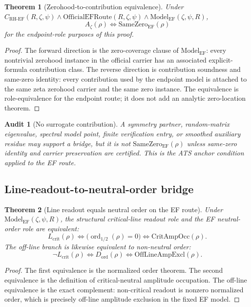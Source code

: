\documentclass[11pt]{article}
\newtheorem{theorem}{Theorem}[section]
\newtheorem{audit}{Audit}[section]
\newcommand{\Az}{A_{\zeta}}
\newcommand{\Lcrit}{L_{\mathrm{crit}}}
\newcommand{\CRHEF}{C_{\mathrm{RH}\text{-}\mathrm{EF}}}
\newcommand{\ModelEF}{\mathrm{Model}_{\mathrm{EF}}}
\newcommand{\OfficialEFRoute}{\mathrm{OfficialEFRoute}}
\newcommand{\CritAmpOcc}{\mathrm{CritAmpOcc}}
\newcommand{\OffAmpExcl}{\mathrm{OffLineAmpExcl}}
\newcommand{\ordhalf}{\operatorname{ord}_{1/2}}
\newcommand{\Dord}{D_{\mathrm{ord}}}
\newcommand{\SameZeroEF}{\mathrm{SameZero}_{\mathrm{EF}}}
\begin{document}
\begin{theorem}[Zerohood-to-contribution equivalence]
Under \(\CRHEF(R,\zeta,\psi)\wedge \OfficialEFRoute(R,\zeta,\psi)\wedge \ModelEF(\zeta,\psi,R)\),
\[
\Az(\rho)\Longleftrightarrow \SameZeroEF(\rho)
\]
for the endpoint-role purposes of this proof.
\end{theorem}

\begin{proof}
The forward direction is the zero-coverage clause of \(\ModelEF\): every nontrivial zerohood instance in the official carrier has an associated explicit-formula contribution class.  The reverse direction is contribution soundness and same-zero identity: every contribution used by the endpoint model is attached to the same zeta zerohood carrier and the same zero instance.  The equivalence is role-equivalence for the endpoint route; it does not add an analytic zero-location theorem.
\end{proof}

\begin{audit}[No surrogate contribution]
A symmetry partner, random-matrix eigenvalue, spectral model point, finite verification entry, or smoothed auxiliary residue may support a bridge, but it is not \(\SameZeroEF(\rho)\) unless same-zero identity and carrier preservation are certified.  This is the ATS anchor condition applied to the EF route.
\end{audit}

\subsection{Line-readout-to-neutral-order bridge}

\begin{theorem}[Line readout equals neutral order on the EF route]
Under \(\ModelEF(\zeta,\psi,R)\), the structural critical-line readout role and the EF neutral-order role are equivalent:
\[
\Lcrit(\rho)\Longleftrightarrow \bigl(\ordhalf(\rho)=0\bigr)
\Longleftrightarrow \CritAmpOcc(\rho).
\]
The off-line branch is likewise equivalent to non-neutral order:
\[
\neg\Lcrit(\rho)\Longleftrightarrow \Dord(\rho)\Longleftrightarrow \OffAmpExcl(\rho).
\]
\end{theorem}

\begin{proof}
The first equivalence is the normalized order theorem.  The second equivalence is the definition of critical-neutral amplitude occupation.  The off-line equivalence is the exact complement: non-critical readout is nonzero normalized order, which is precisely off-line amplitude exclusion in the fixed EF model.
\end{proof}
\end{document}
